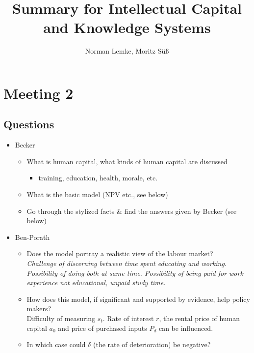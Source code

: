 \documentclass[12pt,a4paper]{article}
\author{Norman Lemke, Moritz Süß}
\begin{document}
  \title{Summary for Intellectual Capital and Knowledge Systems}
  \maketitle
  \tableofcontents
  \thispagestyle{empty}
  \pagebreak


  \section{Meeting 2} %
  \subsection{Questions} %
  \begin{itemize}
    \item Becker
      \begin{itemize}
        \item What is human capital, what kinds of human capital are discussed
          \begin{itemize}
            \item training, education, health, morale, etc.
          \end{itemize}
        \item What is the basic model (NPV etc., see below)
        \item Go through the stylized facts \& find the answers given by Becker (see below)
      \end{itemize}
    \item Ben-Porath
      \begin{itemize}
        \item Does the model portray a realistic view of the labour market? \\
          \emph{Challenge of discerning between time spent educating and working. Possibility of doing both at same time. Possibility of being paid for work experience not educational, unpaid study time.}
        \item How does this model, if significant and supported by evidence, help policy makers? \\
          Difficulty of measuring $s_t$. Rate of interest $r$, the rental price of human capital $a_0$ and price of purchased inputs $P_d$ can be influenced.
        \item In which case could $\delta$ (the rate of deterioration) be negative?
      \end{itemize}


\end{itemize}
\end{document}
